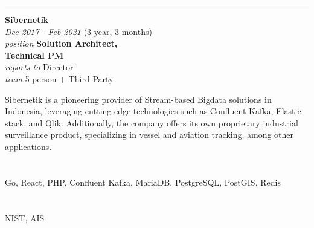 \documentclass[12pt]{res} %
\begin{document}
\begin{resume}
\begin{center}
	\rule{0.5\textwidth}{.2pt}
\end{center}

\vspace{16pt} %
\begin{minipage}[t]{6.5cm}
\begin{flushleft}
	{\large {\bf \href{https://sibernetik.co.id}{Sibernetik}}} \\
	{\footnotesize{\sl Dec 2017 - Feb 2021} \hfill (3 year, 3 months)}\\
	{\footnotesize{\sl position} \hfill \bf{Solution Architect,\\ \hfill Technical PM}}\\
	{\footnotesize{\sl reports to} \hfill Director}\\
	{\footnotesize{\sl team} \hfill 5 person + Third Party}\\
\end{flushleft}
\end{minipage}
\hspace{0.5cm}
\begin{minipage}[t]{0.56\linewidth}
	Sibernetik is a pioneering provider of Stream-based Bigdata solutions in Indonesia, leveraging cutting-edge technologies such as Confluent Kafka, Elastic stack, and Qlik. Additionally, the company offers its own proprietary industrial surveillance product, specializing in vessel and aviation tracking, among other applications.
\end{minipage}

\begin{minipage}[t]{0.48\linewidth}
	\section{}
	\vspace{10pt}
	\begin{flushleft}
		Go, React, PHP, Confluent Kafka, MariaDB, PostgreSQL, PostGIS, Redis
	\end{flushleft}
\end{minipage}%
\hfill
\begin{minipage}[t]{0.48\linewidth}
	\section{}
	\vspace{10pt}
	\begin{flushright}
		NIST, AIS
	\end{flushright}
\end{minipage}


\end{resume}
\end{document}
